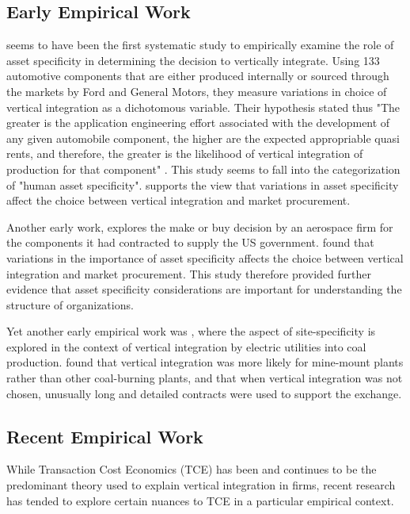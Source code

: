 \documentclass[12pt]{article}
\begin{document}
\subsection{Early Empirical Work}

\cite{Monteverde1982} seems to have been the first systematic study to empirically examine the role of asset specificity in determining the decision to vertically integrate. Using 133 automotive components that are either produced internally or sourced through the markets by Ford and General Motors, they measure variations in choice of vertical integration as a dichotomous variable. Their hypothesis stated thus "The greater is the application engineering effort associated with the development of any given automobile component, the higher are the expected appropriable quasi rents, and therefore, the greater is the likelihood of vertical integration of production for that component" \citep{Monteverde1982}. This study seems to fall into  the \cite{Williamson1983} categorization of "human asset specificity". \cite{Monteverde1982} supports the view that variations in asset specificity affect the choice between vertical integration and market procurement.

Another early work, \cite{Masten1984} explores the make or buy decision by an aerospace firm for the components it had contracted to supply the US government. \cite{Masten1984} found that variations in the importance of asset specificity affects the choice between vertical integration and market procurement. This study therefore provided further evidence that asset specificity considerations are important for understanding the structure of organizations.

Yet another early empirical work was \cite{Joskow1985}, where the aspect of site-specificity \citep{Williamson1983} is explored in the context of vertical integration by electric utilities into coal production. \cite{Joskow1985} found that vertical integration was more likely for mine-mount plants rather than other coal-burning plants, and that when vertical integration was not chosen, unusually long and detailed contracts were used to support the exchange.


\subsection{Recent Empirical Work}
While Transaction Cost Economics (TCE) has been and continues to be the predominant theory used to explain vertical integration in firms, recent research has tended to explore certain nuances to TCE in a particular empirical context. 
\end{document}
